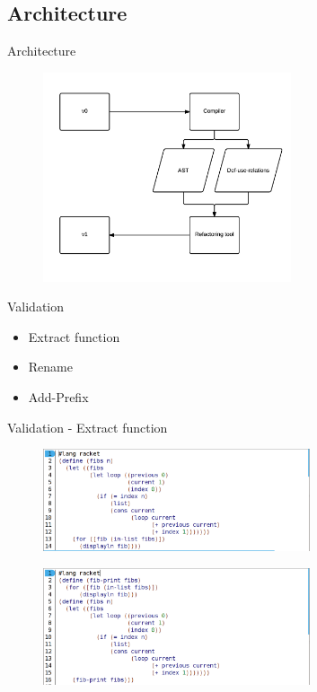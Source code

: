 \documentclass[xcolor=dvipsnames, 14pt]{beamer}
\begin{document}
\subsection{Architecture}
\begin{frame}{Architecture}
\begin{figure}[htbp]
  \centering
  \includegraphics[width=0.65\textwidth]{img/arquitectura.png}
  \label{fig:label}
\end{figure}
\end{frame}
\begin{frame}{Validation}
  \begin{itemize}
  \setlength\itemsep{2em}
  \item {
    Extract function
  }
  \item {
    Rename
  }
  \item {
    Add-Prefix
  }
  \end{itemize}
\end{frame}
\begin{frame}{Validation - Extract function}
\begin{figure}[htbp]
  \centering
  \includegraphics[width=0.7\textwidth]{img/fibonacci.png}
  \label{fig:fib-extract}
\end{figure}

\begin{figure}[htbp]
  \centering
  \includegraphics[width=0.7\textwidth]{img/fibonacci-extracted-lprint.png}
  \label{fig:fib-extract-one}
\end{figure}
\end{frame}
\end{document}
